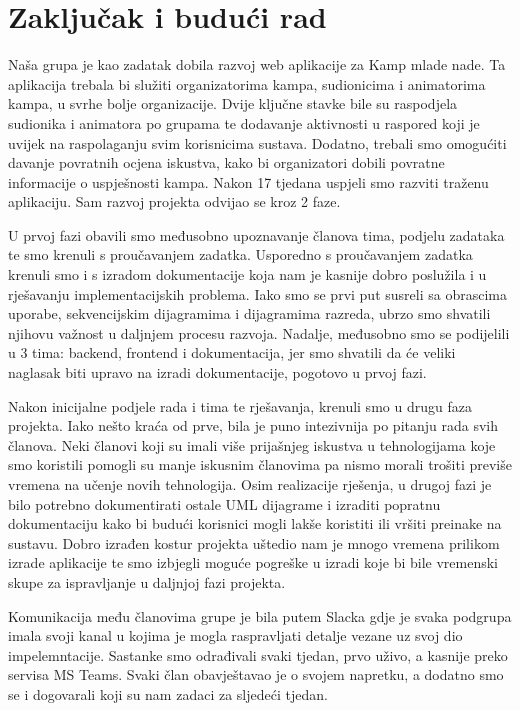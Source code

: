 \chapter{Zaključak i budući rad}
		
		Naša grupa je kao zadatak dobila razvoj web aplikacije za Kamp mlade nade. Ta aplikacija trebala bi služiti organizatorima kampa, sudionicima i animatorima kampa, u svrhe bolje organizacije. Dvije ključne stavke bile su raspodjela sudionika i animatora po grupama te dodavanje aktivnosti u raspored koji je uvijek na raspolaganju svim korisnicima sustava. Dodatno, trebali smo omogućiti davanje povratnih ocjena iskustva, kako bi organizatori dobili povratne informacije o uspješnosti kampa. Nakon 17 tjedana uspjeli smo razviti traženu aplikaciju. Sam razvoj projekta odvijao se kroz 2 faze. 
        
        U prvoj fazi obavili smo međusobno upoznavanje članova tima, podjelu zadataka te smo krenuli s proučavanjem zadatka. Usporedno s proučavanjem zadatka krenuli smo i s izradom dokumentacije koja nam je kasnije dobro poslužila i u rješavanju implementacijskih problema. Iako smo se prvi put susreli sa obrascima uporabe, sekvencijskim dijagramima i dijagramima razreda, ubrzo smo shvatili njihovu važnost u daljnjem procesu razvoja. Nadalje, međusobno smo se podijelili u 3 tima: backend, frontend i dokumentacija, jer smo shvatili da će veliki naglasak biti upravo na izradi dokumentacije, pogotovo u prvoj fazi.
        
        Nakon inicijalne podjele rada i tima te rješavanja, krenuli smo
		u drugu faza projekta. Iako nešto kraća od prve, bila je puno intezivnija po pitanju rada svih članova. Neki članovi koji su imali više prijašnjeg iskustva u tehnologijama koje smo koristili pomogli su manje iskusnim članovima pa nismo morali trošiti previše vremena na učenje novih tehnologija. Osim realizacije rješenja, u drugoj fazi je bilo potrebno dokumentirati ostale UML dijagrame i izraditi popratnu dokumentaciju kako bi budući korisnici mogli lakše koristiti ili vršiti preinake na sustavu. Dobro izrađen kostur projekta uštedio nam je mnogo vremena prilikom izrade aplikacije te smo izbjegli moguće pogreške u izradi koje bi bile vremenski skupe za ispravljanje u daljnjoj fazi projekta.
		
		Komunikacija među članovima grupe je bila putem Slacka gdje je svaka podgrupa imala svoji kanal u kojima je mogla raspravljati detalje vezane uz svoj dio impelemntacije. Sastanke smo odrađivali svaki tjedan, prvo uživo, a kasnije preko servisa MS Teams. Svaki član obavještavao je o svojem napretku, a dodatno smo se i dogovarali koji su nam zadaci za sljedeći tjedan.
		
